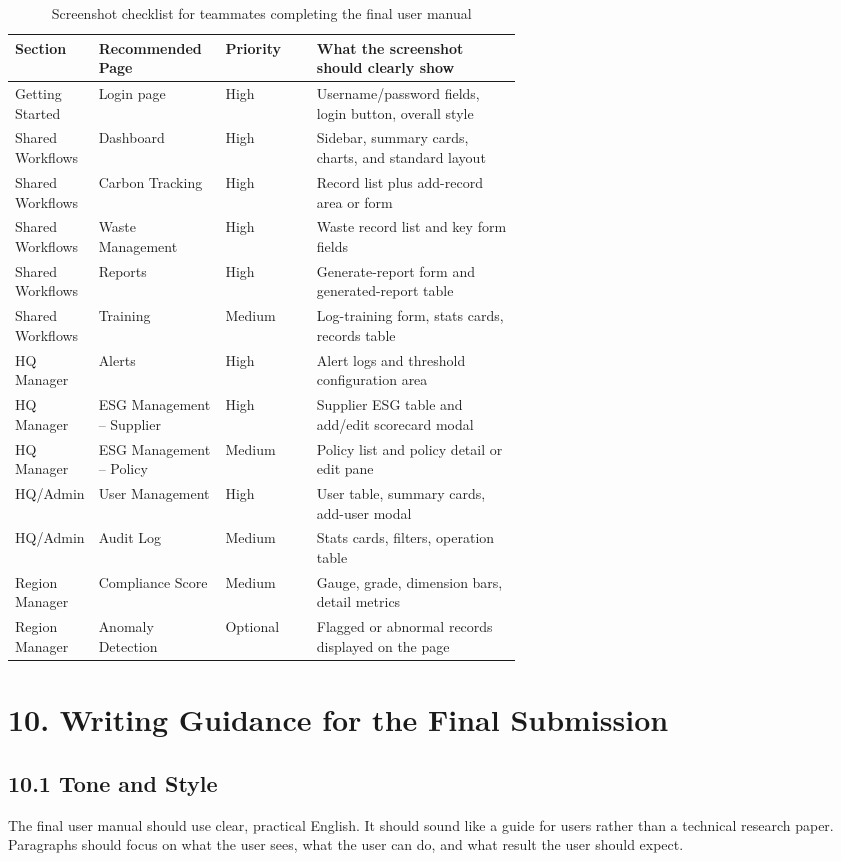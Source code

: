 \documentclass[10pt,a4paper]{article}
\begin{document}
\begin{table}[h]
\centering
\scriptsize
\begin{tabularx}{\linewidth}{@{}p{0.16\linewidth}p{0.25\linewidth}p{0.18\linewidth}X@{}}
\toprule
\textbf{Section} & \textbf{Recommended Page} & \textbf{Priority} & \textbf{What the screenshot should clearly show} \\
\midrule
Getting Started & Login page & High & Username/password fields, login button, overall style \\
Shared Workflows & Dashboard & High & Sidebar, summary cards, charts, and standard layout \\
Shared Workflows & Carbon Tracking & High & Record list plus add-record area or form \\
Shared Workflows & Waste Management & High & Waste record list and key form fields \\
Shared Workflows & Reports & High & Generate-report form and generated-report table \\
Shared Workflows & Training & Medium & Log-training form, stats cards, records table \\
HQ Manager & Alerts & High & Alert logs and threshold configuration area \\
HQ Manager & ESG Management -- Supplier & High & Supplier ESG table and add/edit scorecard modal \\
HQ Manager & ESG Management -- Policy & Medium & Policy list and policy detail or edit pane \\
HQ/Admin & User Management & High & User table, summary cards, add-user modal \\
HQ/Admin & Audit Log & Medium & Stats cards, filters, operation table \\
Region Manager & Compliance Score & Medium & Gauge, grade, dimension bars, detail metrics \\
Region Manager & Anomaly Detection & Optional & Flagged or abnormal records displayed on the page \\
\bottomrule
\end{tabularx}
\caption{Screenshot checklist for teammates completing the final user manual}
\end{table}

\section*{10. Writing Guidance for the Final Submission}

\subsection*{10.1 Tone and Style}
The final user manual should use clear, practical English. It should sound like a guide for users rather than a technical research paper. Paragraphs should focus on what the user sees, what the user can do, and what result the user should expect.
\end{document}
